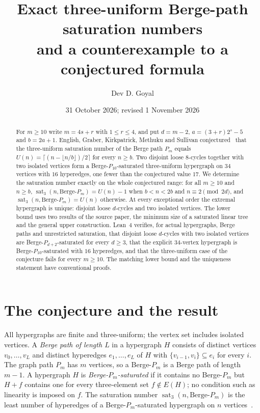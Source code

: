\documentclass[11pt]{article}
\title{\textbf{Exact three-uniform Berge-path saturation numbers\\and a counterexample to a conjectured formula}}
\author{Dev D. Goyal}
\date{31 October 2026; revised 1 November 2026}
\theoremstyle{definition}
\theoremstyle{remark}
\newcommand{\sat}{\operatorname{sat}}
\newcommand{\BP}{\text{Berge-}P}
\begin{document}
\maketitle
\begin{abstract}
For $m\ge 10$ write $m=4s+r$ with $1\le r\le 4$, and put $d=m-2$,
$a=(3+r)2^s-5$ and $b=2a+1$. English, Graber, Kirkpatrick, Methuku and
Sullivan conjectured~\cite{EGKMS} that the three-uniform saturation number of the
Berge path $P_m$ equals $U(n)=\lceil (n-\lfloor n/b\rfloor)/2\rceil$ for every
$n\ge b$. Two disjoint loose $8$-cycles together with two isolated
vertices form a Berge-$P_{10}$-saturated three-uniform hypergraph on $34$
vertices with $16$ hyperedges, one fewer than the conjectured value $17$.
We determine the saturation number exactly on the whole conjectured range:
for all $m\ge10$ and $n\ge b$, $\sat_3(n,\BP_m)=U(n)-1$ when $b<n<2b$ and
$n\equiv 2\pmod{2d}$, and $\sat_3(n,\BP_m)=U(n)$ otherwise. At every
exceptional order the extremal hypergraph is unique: disjoint loose
$d$-cycles and two isolated vertices. The lower bound uses two results of
the source paper, the minimum size of a saturated linear tree and the
general upper construction. Lean~4 verifies, for actual hypergraphs, Berge
paths and unrestricted saturation, that disjoint loose $d$-cycles with two
isolated vertices are Berge-$P_{d+2}$-saturated for every $d\ge3$, that the
explicit $34$-vertex hypergraph is Berge-$P_{10}$-saturated with $16$
hyperedges, and that the three-uniform case of the conjecture fails for
every $m\ge10$. The matching lower bound and the uniqueness statement have
conventional proofs.
\end{abstract}

\section{The conjecture and the result}

All hypergraphs are finite and three-uniform; the vertex set includes
isolated vertices. A \emph{Berge path of length $L$} in a hypergraph $H$
consists of distinct vertices $v_0,\dots,v_L$ and distinct hyperedges
$e_1,\dots,e_L$ of $H$ with $\{v_{i-1},v_i\}\subseteq e_i$ for every $i$.
The graph path $P_m$ has $m$ vertices, so a Berge-$P_m$ is a Berge path of
length $m-1$. A hypergraph $H$ is \emph{Berge-$P_m$-saturated} if it
contains no Berge-$P_m$ but $H+f$ contains one for every three-element set
$f\notin E(H)$; no condition such as linearity is imposed on $f$. The
saturation number $\sat_3(n,\BP_m)$ is the least number of hyperedges of a
Berge-$P_m$-saturated hypergraph on $n$ vertices~\cite{EGKMS}.
\end{document}
